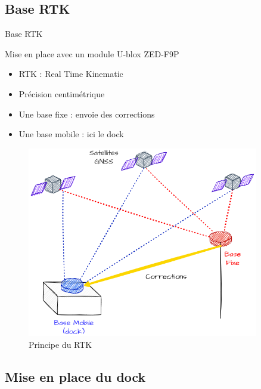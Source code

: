 \documentclass[pdftex,beamer,aspectratio=169]{beamer}
\theoremstyle{definition}
\theoremstyle{example}
\theoremstyle{plain}
\begin{document}
\subsection{Base RTK}
\begin{frame}[fragile]{Base RTK}
  \begin{minipage}{0.39\textwidth}
    Mise en place avec un module U-blox ZED-F9P
    \begin{itemize}
      \item RTK : Real Time Kinematic
      \item Précision centimétrique
      \item Une base fixe : envoie des corrections
      \item Une base mobile : ici le dock
    \end{itemize}
  \end{minipage}
  \begin{minipage}{0.6\textwidth}
    \begin{figure}
      \centering
      \includegraphics[width=0.9\textwidth]{RTK.png}
      \caption{Principe du RTK}
    \end{figure}
  \end{minipage}
\end{frame}

\subsection{Mise en place du dock}
\end{document}
